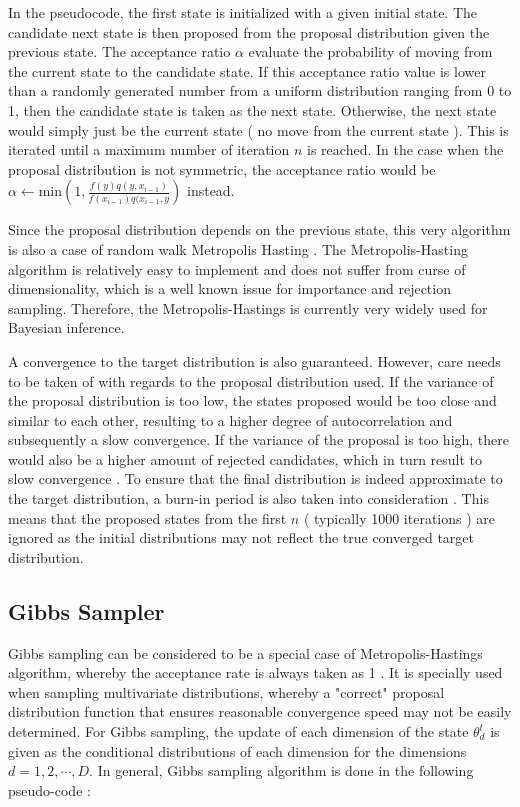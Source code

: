 \documentclass{usiinftr}
\begin{document}
In the pseudocode, the first state is initialized with a given initial state. The candidate next state is then proposed from the proposal distribution given the previous state. The acceptance ratio $\alpha$ evaluate the probability of moving from the current state to the candidate state. If this acceptance ratio value is lower than a randomly generated number from a uniform distribution ranging from 0 to 1, then the candidate state is taken as the next state. Otherwise, the next state would simply just be the current state ( no move from the current state ). This is iterated until a maximum number of iteration $n$ is reached. In the case when the proposal distribution is not symmetric, the acceptance ratio would be $ \alpha \gets \textrm{min}\left(1, \frac{f(y)q(y,x_{i-1})}{f(x_{i-1})q(x_{i-1},y}\right)$ instead. 

Since the proposal distribution depends on the previous state, this very algorithm is also a case of random walk Metropolis Hasting \cite{21}. The Metropolis-Hasting algorithm is relatively easy to implement and does not suffer from curse of dimensionality, which is a well known issue for importance and rejection sampling. Therefore, the Metropolis-Hastings is currently very widely used for Bayesian inference. 

A convergence to the target distribution is also guaranteed. However, care needs to be taken of with regards to the proposal distribution used. If the variance of the proposal distribution is too low, the states proposed would be too close and similar to each other, resulting to a higher degree of autocorrelation and subsequently a slow convergence. If the variance of the proposal is too high, there would also be a higher amount of rejected candidates, which in turn result to slow convergence \cite{30}. To ensure that the final distribution is indeed approximate to the target distribution, a burn-in period is also taken into consideration \cite{29}. This means that the proposed states from the first $n$ ( typically 1000 iterations ) are ignored as the initial distributions may not reflect the true converged target distribution.


\subsection{Gibbs Sampler} 
Gibbs sampling can be considered to be a special case of Metropolis-Hastings algorithm, whereby the acceptance rate is always taken as 1 \cite{21}. It is specially used when sampling multivariate distributions, whereby a "correct" proposal distribution function that ensures reasonable convergence speed may not be easily determined. For Gibbs sampling, the update of each dimension of the state $\theta^{t}_d$ is given as the conditional distributions of each dimension for the dimensions $d = 1,2,\cdots,D$. In general, Gibbs sampling algorithm is done in the following pseudo-code \cite{21}:
\end{document}
